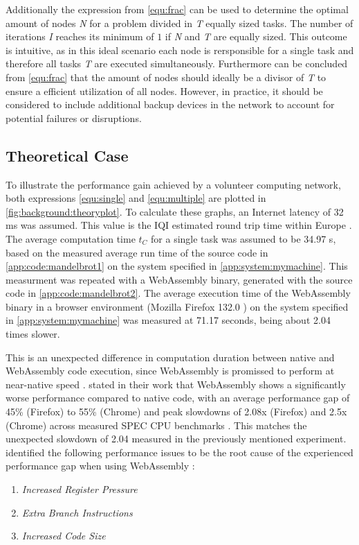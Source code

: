 Additionally the expression from \eqref{equ:frac} can be used to determine the optimal amount of nodes \emph{N} for a problem divided in \emph{T} equally sized tasks. The number of iterations \emph{I} reaches its minimum of $1$ if \emph{N} and \emph{T} are equally sized. This outcome is intuitive, as in this ideal scenario each node is rersponsible for a single task and therefore all tasks \emph{T} are executed simultaneously. Furthermore can be concluded from \eqref{equ:frac} that the amount of nodes should ideally be a divisor of \emph{T} to ensure a efficient utilization of all nodes. However, in practice, it should be considered to include additional backup devices in the network to account for potential failures or disruptions.

\subsection{Theoretical Case}
To illustrate the performance gain achieved by a volunteer computing network, both expressions \eqref{equ:single} and \eqref{equ:multiple} are plotted in \autoref{fig:background:theoryplot}. To calculate these graphs, an Internet latency of 32 ms \cite{backend:latency} was assumed. This value is the \ac{IQI} estimated round trip time within Europe \cite{backend:latency}. The average computation time $t_{C}$ for a single task was assumed to be 34.97 s, based on the measured average run time of the source code in \autoref{app:code:mandelbrot1} on the system specified in \autoref{app:system:mymachine}. This measurment was repeated with a WebAssembly binary, generated with the source code in \autoref{app:code:mandelbrot2}. The average execution time of the WebAssembly binary in a browser environment (Mozilla Firefox 132.0 \cite{background:firefox}) on the system specified in \autoref{app:system:mymachine} was measured at 71.17 seconds, being about 2.04 times slower. 
\newline
\begin{addmargin}[25pt]{25pt}
  This is an unexpected difference in computation duration between native and WebAssembly code execution, since WebAssembly is promissed to perform at near-native speed \cite{methodology:wasm}. \citeauthor{background:not-so-fast} stated in their work that WebAssembly shows a significantly worse performance compared to native code, with an average performance gap of 45\% (Firefox) to 55\% (Chrome) and peak slowdowns of 2.08x (Firefox) and 2.5x (Chrome) across measured SPEC CPU benchmarks \cite{background:not-so-fast}. This matches the unexpected slowdown of 2.04 measured in the previously mentioned experiment. \citeauthor{background:not-so-fast} identified the following performance issues to be the root cause of the experienced performance gap when using WebAssembly \cite{background:not-so-fast}:
  \begin{enumerate}
    \item \emph{Increased Register Pressure}
    \item \emph{Extra Branch Instructions}
    \item \emph{Increased Code Size}
  \end{enumerate}
\end{addmargin}
